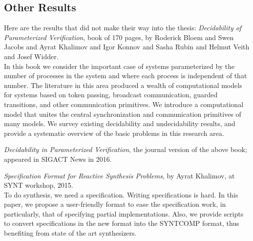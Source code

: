 \subsection*{Other Results}

Here are the results that did not make their way into the thesis:
\li
{}
   \emph{Decidability of Parameterized Verification},
   book of 170 pages,
   by Roderick Bloem and
               Swen Jacobs and
               Ayrat Khalimov and
               Igor Konnov and
               Sasha Rubin and
               Helmut Veith and
               Josef Widder.\\
In this book we consider the important case of systems parameterized by the number of processes in the system
and where each process is independent of that number.
The literature in this area produced a wealth of computational models for systems based on token passing,
broadcast communication, guarded transitions, and other communication primitives.
We introduce a computational model that unites the central synchronization and
communication primitives of many models.
We survey existing decidability and undecidability results,
and provide a systematic overview of the basic problems in this research area.


   \emph{Decidability in Parameterized Verification},
   the journal version of the above book; appeared in SIGACT News in 2016.

   \emph{Specification Format for Reactive Synthesis Problems},
   by Ayrat Khalimov,
   at SYNT workshop, 2015.\\
To do synthesis, we need a specification.
Writing specifications is hard.
In this paper, we propose a user-friendly format to ease
the specification work, in particularly, that of specifying partial implementations.
Also, we provide scripts to convert specifications in the new format into the SYNTCOMP format,
thus benefiting from state of the art synthesizers.

